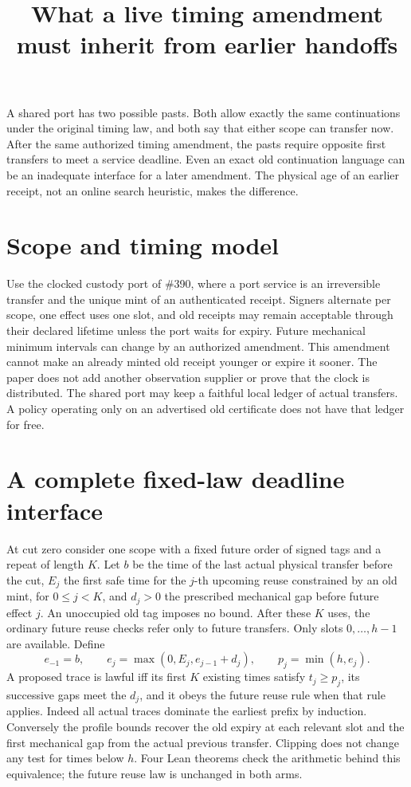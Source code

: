 \documentclass[11pt]{article}
\title{What a live timing amendment must inherit from earlier handoffs}
\date{}
\begin{document}
\maketitle

A shared port has two possible pasts. Both allow exactly the same
continuations under the original timing law, and both say that either
scope can transfer now. After the same authorized timing amendment, the
pasts require opposite first transfers to meet a service deadline. Even
an exact old continuation language can be an inadequate interface for a
later amendment. The physical age of an earlier receipt, not an online
search heuristic, makes the difference.

\section{Scope and timing model}
Use the clocked custody port of \#390, where a port service is an
irreversible transfer and the unique mint of an authenticated receipt.
Signers alternate per scope, one effect uses one slot, and old receipts
may remain acceptable through their declared lifetime unless the port
waits for expiry. Future mechanical minimum intervals can change by an
authorized amendment. This amendment cannot make an already minted old
receipt younger or expire it sooner. The paper does not add another
observation supplier or prove that the clock is distributed. The shared
port may keep a faithful local ledger of actual transfers. A policy
operating only on an advertised old certificate does not have that ledger
for free.

\section{A complete fixed-law deadline interface}
At cut zero consider one scope with a fixed future order of signed tags
and a repeat of length \(K\). Let \(b\) be the time of the last actual
physical transfer before the cut, \(E_j\) the first safe time for the
\(j\)-th upcoming reuse constrained by an old mint, for \(0\leq j<K\),
and \(d_j>0\) the prescribed mechanical gap before future effect \(j\).
An unoccupied old tag imposes no bound. After these \(K\) uses, the
ordinary future reuse checks refer only to future transfers. Only slots
\(0,\ldots,h-1\) are available. Define
\[
 e_{-1}=b,\qquad e_j=\max(0,E_j,e_{j-1}+d_j),\qquad p_j=\min(h,e_j).
\]
A proposed trace is lawful iff its first \(K\) existing times satisfy
\(t_j\geq p_j\), its successive gaps meet the \(d_j\), and it obeys the
future reuse rule when that rule applies. Indeed all actual traces
dominate the earliest prefix by induction. Conversely the profile
bounds recover the old expiry at each relevant slot and the first
mechanical gap from the actual previous transfer. Clipping does not
change any test for times below \(h\). Four Lean theorems check the
arithmetic behind this equivalence; the future reuse law is unchanged
in both arms.
\end{document}
